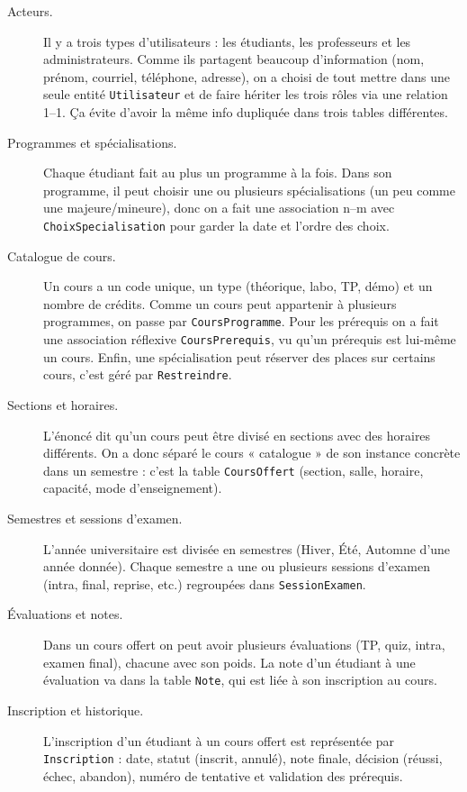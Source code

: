 \documentclass[11pt,a4paper]{article}
\begin{document}
\begin{description}
    \item[Acteurs.] Il y a trois types d'utilisateurs : les étudiants,
        les professeurs et les administrateurs. Comme ils partagent
        beaucoup d'information (nom, prénom, courriel, téléphone,
        adresse), on a choisi de tout mettre dans une seule entité
        \texttt{Utilisateur} et de faire hériter les trois rôles via une
        relation 1--1. Ça évite d'avoir la même info dupliquée dans
        trois tables différentes.
    \item[Programmes et spécialisations.] Chaque étudiant fait au plus
        un programme à la fois. Dans son programme, il peut choisir une
        ou plusieurs spécialisations (un peu comme une majeure/mineure),
        donc on a fait une association n--m avec \texttt{ChoixSpecialisation}
        pour garder la date et l'ordre des choix.
    \item[Catalogue de cours.] Un cours a un code unique, un type
        (théorique, labo, TP, démo) et un nombre de crédits. Comme un
        cours peut appartenir à plusieurs programmes, on passe par
        \texttt{CoursProgramme}. Pour les prérequis on a fait une
        association réflexive \texttt{CoursPrerequis}, vu qu'un prérequis
        est lui-même un cours. Enfin, une spécialisation peut réserver
        des places sur certains cours, c'est géré par \texttt{Restreindre}.
    \item[Sections et horaires.] L'énoncé dit qu'un cours peut être
        divisé en sections avec des horaires différents. On a donc
        séparé le cours « catalogue » de son instance concrète dans un
        semestre : c'est la table \texttt{CoursOffert}
        (section, salle, horaire, capacité, mode d'enseignement).
    \item[Semestres et sessions d'examen.] L'année universitaire est
        divisée en semestres (Hiver, Été, Automne d'une année donnée).
        Chaque semestre a une ou plusieurs sessions d'examen (intra,
        final, reprise, etc.) regroupées dans \texttt{SessionExamen}.
    \item[Évaluations et notes.] Dans un cours offert on peut avoir
        plusieurs évaluations (TP, quiz, intra, examen final), chacune
        avec son poids. La note d'un étudiant à une évaluation va dans
        la table \texttt{Note}, qui est liée à son inscription au cours.
    \item[Inscription et historique.] L'inscription d'un étudiant à un
        cours offert est représentée par \texttt{Inscription} : date,
        statut (inscrit, annulé), note finale, décision (réussi, échec,
        abandon), numéro de tentative et validation des prérequis.
\end{description}
\end{document}
